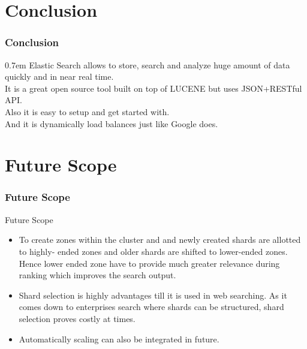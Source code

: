 \documentclass[xcolor=dvipsnames]{beamer}
\begin{document}
\section{Conclusion}
\begin{frame}
\frametitle{Conclusion}
\openup 0.7em
Elastic Search allows to store, search and analyze huge amount of data quickly and in near real time.\\ It is a great open source tool built on top of LUCENE but uses JSON+RESTful API.\\ Also it is easy to setup and get started with.\\ And it is dynamically load balances just like Google does. 
\end{frame}
\section{Future Scope}
\begin{frame}
\frametitle{Future Scope}
\begin{alertblock}{Future Scope}
\begin{itemize}
\item To create zones within the cluster and and newly created shards are allotted to highly- ended zones and older shards are shifted to lower-ended zones. Hence lower ended zone have to provide much greater relevance during ranking which improves the search output.
\item Shard selection is highly advantages till it is used in web searching. As it comes down to enterprises search where shards can be structured, shard selection proves costly at times.
\item Automatically scaling can also be integrated in future. 
\end{itemize}
\end{alertblock}
\end{frame}
\end{document}

